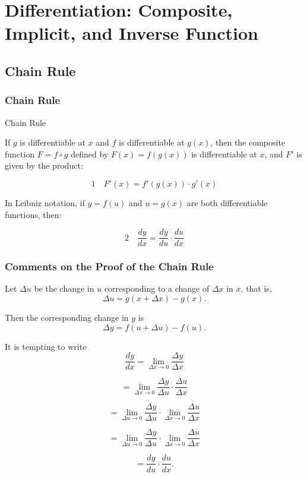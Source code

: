 \documentclass[12pt]{article}
\theoremstyle{beautifulthm}
\begin{document}
\newpage
\section{Differentiation: Composite, Implicit, and Inverse Function}
\newpage
\subsection{Chain Rule}
\subsubsection{Chain Rule}
\begin{mytheorem}{Chain Rule}{}

If \(g\) is differentiable at \(x\) and \(f\) is differentiable at \(g(x)\), then the composite function \(F = f \circ g\) defined by \(F(x) = f(g(x))\) is differentiable at \(x\), and \(F'\) is given by the product:

\[
\boxed{1} \quad F'(x) = f'(g(x)) \cdot g'(x)
\]

\noindent
In Leibniz notation, if \(y = f(u)\) and \(u = g(x)\) are both differentiable functions, then:

\[
\boxed{2} \quad \frac{dy}{dx} = \frac{dy}{du} \cdot \frac{du}{dx}
\]
\end{mytheorem}
\subsubsection*{Comments on the Proof of the Chain Rule}

Let \(\Delta u\) be the change in \(u\) corresponding to a change of \(\Delta x\) in \(x\), that is,
\[
\Delta u = g(x + \Delta x) - g(x).
\]

Then the corresponding change in \(y\) is
\[
\Delta y = f(u + \Delta u) - f(u).
\]

It is tempting to write
\[
\frac{dy}{dx} = \lim_{\Delta x \to 0} \frac{\Delta y}{\Delta x}
\]

\[
= \lim_{\Delta x \to 0} \frac{\Delta y}{\Delta u} \cdot \frac{\Delta u}{\Delta x}
\]

\[
= \lim_{\Delta u \to 0} \frac{\Delta y}{\Delta u} \cdot \lim_{\Delta x \to 0} \frac{\Delta u}{\Delta x}
\]

\[
= \lim_{\Delta u \to 0} \frac{\Delta y}{\Delta u} \cdot \lim_{\Delta x \to 0} \frac{\Delta u}{\Delta x}
\]

\[
= \frac{dy}{du} \cdot \frac{du}{dx}.
\]
\end{document}
